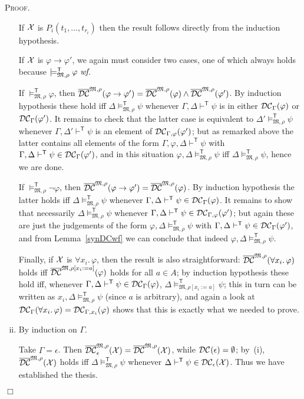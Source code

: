 \documentclass{article}
\newenvironment{proof}{\smallskip\textsc{Proof.}}{\hspace*{\fill}$\Box$}
\newcommand{\wf}{\ \mbox{\em wf}}
\newcommand{\myvdash}[1]{\ensuremath{\vdash^{\mathsf{#1}}}}
\newcommand{\mymodelss}[3]{\ensuremath{\models_{\mathfrak{#2},{#3}}^{\mathsf{#1}}}}
\newcommand{\synDC}[1][{}]{\ifthenelse{\equal{#1}{}}{%
{\ensuremath{{\cal{DC}}}}}{%
{\ensuremath{{\cal{DC}}_{#1}}}}}
\newcommand{\semDC}[2][{\mathfrak M},\rho]{\ensuremath{\overline{\cal{DC}}^{#1}_{#2}}}
\def\sep{.\,}
\begin{document}
\begin{proof}
\begin{enumerate}[(i)]
If ${\cal X}$ is $P_i(t_1,\ldots,t_{r_i})$ then the result follows
directly from the induction hypothesis.

If ${\cal X}$ is $\varphi\to\varphi'$, we again must consider two cases, one
of which always holds because $\mymodelss{T}M\rho\varphi\wf$.

If $\mymodelss{T}M\rho\varphi$, then
$\semDC{}(\varphi\to\varphi')=\semDC{}(\varphi)\wedge\semDC{}(\varphi')$.
By induction hypothesis these hold iff
$\Delta\mymodelss{T}M\rho\psi$ whenever $\Gamma,\Delta\myvdash{T}\psi$ is
in either $\synDC[\Gamma](\varphi)$ or $\synDC[\Gamma](\varphi')$.  It
remains to check that the latter case is equivalent to
$\Delta'\mymodelss{T}M\rho\psi$ whenever $\Gamma,\Delta'\myvdash{T}\psi$
is an element of $\synDC[\Gamma,\varphi](\varphi')$; but as remarked
above the latter contains all elements of the form
$\Gamma,\varphi,\Delta\myvdash{T}\psi$ with
$\Gamma,\Delta\myvdash{T}\psi\in\synDC[\Gamma](\varphi')$, and in this
situation $\varphi,\Delta\mymodelss{T}M\rho\psi$ iff
$\Delta\mymodelss{T}M\rho\psi$, hence we are done.

If $\mymodelss{T}M\rho\neg\varphi$, then
$\semDC{}(\varphi\to\varphi')=\semDC{}(\varphi)$.
By induction hypothesis the latter holds iff
$\Delta\mymodelss{T}M\rho\psi$ whenever
$\Gamma,\Delta\myvdash{T}\psi\in\synDC[\Gamma](\varphi)$.  It
remains to show that necessarily
$\Delta\mymodelss{T}M\rho\psi$ whenever
$\Gamma,\Delta\myvdash{T}\psi\in\synDC[\Gamma,\varphi](\varphi')$;
but again these are just the judgements of the form
$\varphi,\Delta\mymodelss{T}M\rho\psi$ with
$\Gamma,\Delta\myvdash{T}\psi\in\synDC[\Gamma](\varphi')$, and from
Lemma~\ref{synDCwf} we can conclude that indeed
$\varphi,\Delta\mymodelss{T}M\rho\psi$.

Finally, if ${\cal X}$ is $\forall x_i\sep\varphi$, then the
result is also straightforward:
$\semDC{}(\forall x_i\sep\varphi)$ holds iff
$\semDC[\mathfrak M,{\rho[x_i:=a]}]{}(\varphi)$ holds for all $a\in A$;
by induction hypothesis these hold iff, whenever
$\Gamma,\Delta\myvdash{T}\psi\in\synDC[\Gamma](\varphi)$,
$\Delta\mymodelss{T}M{\rho[x_i:=a]}\psi$; this in turn can be
written as $x_i,\Delta\mymodelss{T}M{\rho}\psi$ (since $a$ is arbitrary),
and again a look at
$\synDC[\Gamma](\forall x_i\sep\varphi)=\synDC[\Gamma,x_i](\varphi)$ shows
that this is exactly what we needed to prove.
\item By induction on $\Gamma$.

Take $\Gamma=\epsilon$.  Then $\semDC{\epsilon}({\cal X})=\semDC{}({\cal X})$,
while $\synDC(\epsilon)=\emptyset$; by~(i), $\semDC{}({\cal X})$ holds iff
$\Delta\mymodelss{T}M\rho\psi$ whenever
$\Delta\myvdash{T}\psi\in\synDC[\epsilon]({\cal X})$.  Thus we have
established the thesis.


\end{enumerate}
\end{proof}
\end{document}
